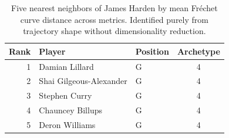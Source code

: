 \begin{table}[htbp]
  \centering\small
  \begin{tabular}{rllc}
    \toprule
    Rank & Player & Position & Archetype \\
    \midrule
    1 & Damian Lillard & G & 4 \\
    2 & Shai Gilgeous-Alexander & G & 4 \\
    3 & Stephen Curry & G & 4 \\
    4 & Chauncey Billups & G & 4 \\
    5 & Deron Williams & G & 4 \\
    \bottomrule
  \end{tabular}
  \caption{Five nearest neighbors of James Harden by mean Fr\'{e}chet curve distance across metrics. Identified purely from trajectory shape without dimensionality reduction.}
  \label{tab:James_Harden_frechet_curve_neighbors}
\end{table}

